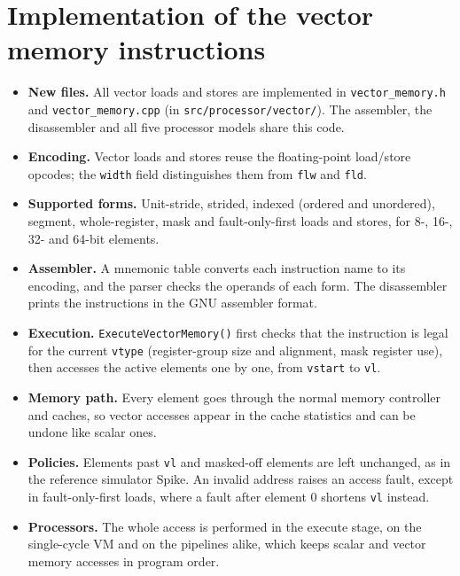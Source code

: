 \documentclass[11pt,a4paper]{article}
\newcommand{\code}[1]{\texttt{#1}}
\begin{document}
\section{Implementation of the vector memory instructions}

\begin{itemize}
  \item \textbf{New files.} All vector loads and stores are implemented in
        \code{vector\_memory.h} and \code{vector\_memory.cpp} (in \code{src/processor/vector/}). The
        assembler, the disassembler and all five processor models share this code.
  \item \textbf{Encoding.} Vector loads and stores reuse the floating-point load/store opcodes; the
        \code{width} field distinguishes them from \code{flw} and \code{fld}.
  \item \textbf{Supported forms.} Unit-stride, strided, indexed (ordered and unordered), segment,
        whole-register, mask and fault-only-first loads and stores, for 8-, 16-, 32- and 64-bit
        elements.
  \item \textbf{Assembler.} A mnemonic table converts each instruction name to its encoding, and
        the parser checks the operands of each form. The disassembler prints the instructions in
        the GNU assembler format.
  \item \textbf{Execution.} \code{ExecuteVectorMemory()} first checks that the instruction is
        legal for the current \code{vtype} (register-group size and alignment, mask register use),
        then accesses the active elements one by one, from \code{vstart} to \code{vl}.
  \item \textbf{Memory path.} Every element goes through the normal memory controller and caches,
        so vector accesses appear in the cache statistics and can be undone like scalar ones.
  \item \textbf{Policies.} Elements past \code{vl} and masked-off elements are left unchanged, as
        in the reference simulator Spike. An invalid address raises an access fault, except in
        fault-only-first loads, where a fault after element 0 shortens \code{vl} instead.
  \item \textbf{Processors.} The whole access is performed in the execute stage, on the
        single-cycle VM and on the pipelines alike, which keeps scalar and vector memory accesses
        in program order.
\end{itemize}
\end{document}
